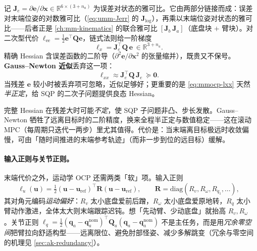 \begin{derivation}
记 $\mathbf J_e=\partial\mathbf e/\partial\mathbf x\in\mathbb R^{6\times(3+n_a)}$ 为误差对状态的雅可比。它由两部分链接而成：误差对末端位姿的对数雅可比（\cref{eq:umm-Jerr} 的 $\mathbf J_{\log}$），再乘以末端位姿对状态的雅可比——后者正是 \cref{ch:mm-kinematics} 的联合雅可比 $[\mathbf J_b\ \mathbf J_a]$（底盘块 $+$ 臂块）。对二次型代价 $\ell_{\text{ee}}=\tfrac12\mathbf e^\top\mathbf Q\mathbf e$，链式法则给一阶梯度
\begin{equation}
  \boldsymbol\ell_x=\mathbf J_e^\top\mathbf Q\,\mathbf e\ \in\mathbb R^{3+n_a}.
  \label{eq:mmocp-lx}
\end{equation}
精确 Hessian 含误差函数的二阶导（$\partial^2\mathbf e/\partial\mathbf x^2$ 的张量缩并），既贵又不保号。\textbf{Gauss--Newton 近似}丢弃这一项：
\begin{equation}
  \boldsymbol\ell_{xx}\approx\mathbf J_e^\top\mathbf Q\,\mathbf J_e\ \succeq\mathbf 0.
  \label{eq:mmocp-lxx}
\end{equation}
当残差 $\mathbf e$ 较小时被丢弃项可忽略，近似足够好；更重要的是 \cref{eq:mmocp-lxx} 天然\emph{半正定}，给 SQP 的二次子问题提供良态 Hessian。
\end{derivation}

\begin{pitfall}
完整 Hessian 在残差大时可能\emph{不定}，使 SQP 子问题非凸、步长发散。Gauss--Newton 牺牲了远离目标时的二阶精度，换来全程半正定与数值稳定——这在滚动 MPC（每周期只迭代一两步）里尤其值得。代价是：当末端离目标极远时收敛偏慢，可由「随时间推进的末端参考轨迹」（而非一步到位的远目标）缓解。
\end{pitfall}

\paragraph{输入正则与关节正则。}
末端代价之外，运动学 OCP 还需两类「软」项。输入正则
\begin{equation}
  \ell_u(\mathbf u)=\tfrac12(\mathbf u-\mathbf u_{\text{ref}})^\top\mathbf R(\mathbf u-\mathbf u_{\text{ref}}),
  \qquad \mathbf R=\mathrm{diag}(R_v,R_\omega,R_{\dot q_1},\dots),
  \label{eq:mmocp-lu}
\end{equation}
其对角元编码\emph{运动偏好}：$R_v$ 太小底盘爱前后蹭，$R_\omega$ 太小底盘爱原地转，$R_{\dot q}$ 太小臂动作激进，全体太大则末端跟踪迟钝。想「先动臂、少动底盘」就抬高 $R_v,R_\omega$。关节正则 $\ell_q=\tfrac12(\mathbf q_a-\mathbf q_a^{\text{nom}})^\top\mathbf Q_a(\mathbf q_a-\mathbf q_a^{\text{nom}})$ 不是主任务，而是用\emph{冗余零空间}把臂拉向舒适构型——远离限位、避免肘部怪姿、减少多解跳变（冗余与零空间的机理见 \cref{sec:ak-redundancy}）。

